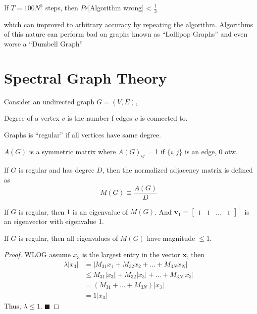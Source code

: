\documentclass[11pt, letter]{book}
\newcommand{\bv}{\mathbf{v}}
\newcommand{\bx}{\mathbf{x}}
\newcommand{\qed}{\hfill $\blacksquare$}
\begin{document}
\begin{proposition}[Alenilaus, 80s]
	If $T = 100N^3$ steps, then $Pr$[Algorithm wrong] < $\frac{1}{3}$
\end{proposition}
which can improved to arbitrary accuracy by repeating the algorithm. Algorithms of this nature can perform bad on graphs known as ``Lollipop Graphs'' and even worse a ``Dumbell Graph''


\section{Spectral Graph Theory}
Consider an undirected graph $G = (V, E)$, 
\begin{definition}[Degree]
	Degree of a vertex $v$ is the number f edges $v$ is connected to.
\end{definition}

\begin{definition}[Regular]
	Graphs is ``regular'' if all vertices have same degree. 
\end{definition}

\begin{definition}
	$A(G)$ is a symmetric matrix where $A(G)_{ij}$ = 1 if $\{i, j\}$ is an edge, 0 otw. 
\end{definition}

\begin{definition}
	If $G$ is regular and has degree $D$, then the normalized adjacency matrix is defined as 
	\begin{equation}
		M(G) \equiv \frac{A(G)}{D}
	\end{equation}
\end{definition}

\begin{lemma}
	If $G$ is regular, then $1$ is an eigenvalue of $M(G)$. And $\bv_1 = \begin{bmatrix}
		1 & 1 & \dots & 1
	\end{bmatrix}^\top$ is an eigenvector with eigenvalue 1. 
\end{lemma}

\begin{proposition}
	\label{prop:eigenvalues_of_regular_graphs}
	If $G$ is regular, then all eigenvalues of $M(G)$ have magnitude $\leq 1$. 
\end{proposition}

\begin{proof}
	WLOG assume $x_3$ is the largest entry in the vector $\bx$, then
	\begin{align}
		\lambda |x_3| 
		&= |M_{31}x_1 + M_{32}x_2 + ... + M_{3N}x_N| \\
		&\leq M_{31}|x_3| + M_{32}|x_3| + ... + M_{3N} |x_3| \\
		&= (M_{31} + \ldots + M_{3N}) |x_3| \\
		&= 1 |x_3|
	\end{align}
	Thus, $\lambda \leq 1$. \qed
\end{proof}
\end{document}
